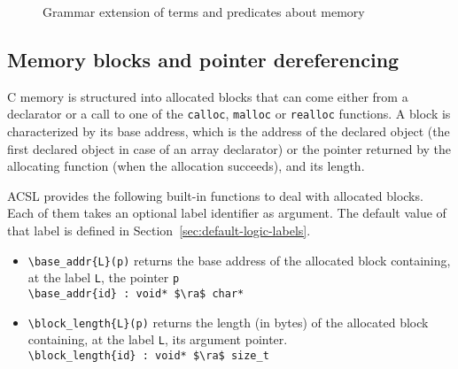 \begin{figure}[t]
  \begin{cadre}
      
    \end{cadre}
  \caption{Grammar extension of terms and predicates about memory}
\label{fig:gram:memory}
\end{figure}



\subsection{Memory blocks and pointer dereferencing}
\label{subsec:memory}
C memory is structured into allocated blocks that can come either from a 
declarator or a call to one of the \lstinline|calloc|, \lstinline|malloc| or
\lstinline|realloc| functions. A block is characterized by its base address, 
which is the address of the declared object (the first declared object 
in case of an array declarator) or the pointer returned by the allocating 
function (when the allocation succeeds), and its length.

ACSL provides the following built-in functions to deal with allocated blocks.
Each of them takes an optional label identifier as argument.
The default value of that label is defined in Section~\ref{sec:default-logic-labels}.
\begin{itemize}
\item \lstinline|\base_addr{L}(p)|
returns the base address of the allocated block
containing, at the label \lstinline|L|, the pointer \lstinline|p|
\\ \makebox[5mm]{} \lstinline|\base_addr{id} : void* $\ra$ char*|

\item \lstinline|\block_length{L}(p)|
  returns the length (in bytes) of the allocated block containing, 
  at the label \lstinline|L|, its argument pointer.
\\ \makebox[5mm]{} \lstinline|\block_length{id} : void* $\ra$ size_t|

\end{itemize}


